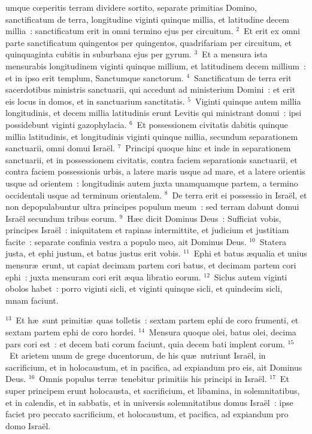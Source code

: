 \bchapter
{}umque cœperitis terram dividere sortito, separate primitias Domino, sanctificatum de terra, longitudine viginti quinque millia, et latitudine decem millia~: sanctificatum erit in omni termino ejus per circuitum.
${}^{2}$~Et erit ex omni parte sanctificatum quingentos per quingentos, quadrifariam per circuitum, et quinquaginta cubitis in suburbana ejus per gyrum.
${}^{3}$~Et a mensura ista mensurabis longitudinem viginti quinque millium, et latitudinem decem millium~: et in ipso erit templum, Sanctumque sanctorum.
${}^{4}$~Sanctificatum de terra erit sacerdotibus ministris sanctuarii, qui accedunt ad ministerium Domini~: et erit eis locus in domos, et in sanctuarium sanctitatis.
${}^{5}$~Viginti quinque autem millia longitudinis, et decem millia latitudinis erunt Levitis qui ministrant domui~: ipsi possidebunt viginti gazophylacia.
${}^{6}$~Et possessionem civitatis dabitis quinque millia latitudinis, et longitudinis viginti quinque millia, secundum separationem sanctuarii, omni domui Isra\"el.
${}^{7}$~Principi quoque hinc et inde in separationem sanctuarii, et in possessionem civitatis, contra faciem separationis sanctuarii, et contra faciem possessionis urbis, a latere maris usque ad mare, et a latere orientis usque ad orientem~: longitudinis autem juxta unamquamque partem, a termino occidentali usque ad terminum orientalem.
${}^{8}$~De terra erit ei possessio in Isra\"el, et non depopulabuntur ultra principes populum meum~: sed terram dabunt domui Isra\"el secundum tribus eorum.
${}^{9}$~H\ae c dicit Dominus Deus~: Sufficiat vobis, principes Isra\"el~: iniquitatem et rapinas intermittite, et judicium et justitiam facite~: separate confinia vestra a populo meo, ait Dominus Deus.
${}^{10}$~Statera justa, et ephi justum, et batus justus erit vobis.
${}^{11}$~Ephi et batus \ae qualia et unius mensur\ae\ erunt, ut capiat decimam partem cori batus, et decimam partem cori ephi~: juxta mensuram cori erit \ae qua libratio eorum.
${}^{12}$~Siclus autem viginti obolos habet~: porro viginti sicli, et viginti quinque sicli, et quindecim sicli, mnam faciunt.


${}^{13}$~Et h\ae\ sunt primiti\ae\ quas tolletis~: sextam partem ephi de coro frumenti, et sextam partem ephi de coro hordei.
${}^{14}$~Mensura quoque olei, batus olei, decima pars cori est~: et decem bati corum faciunt, quia decem bati implent corum.
${}^{15}$~Et arietem unum de grege ducentorum, de his qu\ae\ nutriunt Isra\"el, in sacrificium, et in holocaustum, et in pacifica, ad expiandum pro eis, ait Dominus Deus.
${}^{16}$~Omnis populus terr\ae\ tenebitur primitiis his principi in Isra\"el.
${}^{17}$~Et super principem erunt holocausta, et sacrificium, et libamina, in solemnitatibus, et in calendis, et in sabbatis, et in universis solemnitatibus domus Isra\"el~: ipse faciet pro peccato sacrificium, et holocaustum, et pacifica, ad expiandum pro domo Isra\"el.


